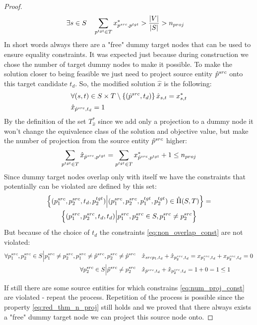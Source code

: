 \begin{proof}
\begin{align*}
    & \exists s \in S \quad
    \sum\limits_{p^{tgt} \in T} x^*_{p^{src}, p^{tgt}} > \frac{|V|}{|S|} >
    n_{proj}
  \end{align*}
  In short words always there are a "free" dummy target nodes that can be used to ensure equality constraints.
  It was expected just because during construction we chose the number of target dummy nodes to make it possible.
  To make the solution closer to being feasible we just need to project source entity \( \hat{p}^{src} \) onto this target
  candidate \( t_d \). So, the modified solution \( \hat{x} \) is the following:
  \begin{align*}
    & \forall (s,t) \in S \times T \setminus \left\{ (\hat{p}^{src}, t_d) \right\} \hat{x}_{s,t} = x^*_{s,t} \\
    & \hat{x}_{\hat{p}^{src}, t_d} = 1
  \end{align*}
  By the definition of the set \( T^*_{\hat{x}} \) since we add only a projection to a dummy node
  it won't change the equivalence class of the solution and objective value, but make the number of projection
  from the source entity \( \hat{p}^{src} \) higher:
  \[
    \sum\limits_{p^{tgt} \in T} \hat{x}_{\hat{p}^{src}, p^{tgt}} =
    \sum\limits_{p^{tgt} \in T} x^*_{\hat{p}^{src}, p^{tgt}} + 1
    \leq n_{proj}
  \]
  Since dummy target nodes overlap only with itself we have the constraints that potentially
  can be violated are defined by this set:
  \begin{multline*}
    \left\{ (p_1^{src}, p_2^{src}, t_d, p_2^{tgt}) \Big| (p_1^{src}, p_2^{src}, p_1^{tgt}, p_2^{tgt}) \in \hat{\Pi}(S, T) \right\} = \\
    \left\{ (p_1^{src}, p_2^{src}, t_d, t_d) \Big| p_1^{src}, p_2^{src} \in S, p_1^{src} \neq p_2^{src} \right\}
  \end{multline*}
  But because of the choice of \( t_d \) the constraints
  \eqref{eq:non_overlap_const} are not violated:
  \begin{align*}
    \forall p_1^{src}, p_2^{src} \in S \Big| p_1^{src} \neq p_2^{src}, p_1^{src} \neq \hat{p}^{src}, p_2^{src} \neq \hat{p}^{src} \quad
    & \hat{x}_{src{p_1}, t_d} + \hat{x}_{p_2^{src}, t_d} = x_{p_1^{src}, t_d} + x_{p_2^{src}, t_d} = 0 \\
    \forall p_2^{src} \in S \Big| \hat{p}^{src} \neq p_2^{src} \quad
    & \hat{x}_{\hat{p}^{src}, t_d} + \hat{x}_{p_2^{src}, t_d} = 1 + 0 = 1 \leq 1
  \end{align*}

  If still there are some source entities for which constrains \eqref{eq:num_proj_const} are violated - repeat the process.
  Repetition of the process is possible since the property \eqref{eq:red_thm_n_proj} still holds and
  we proved that there always exists a "free" dummy target node we can project this source node onto.


\end{proof}
